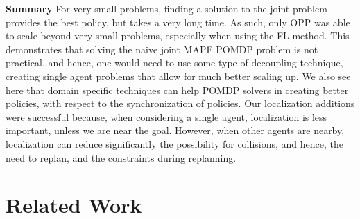 \documentclass[letterpaper]{article}
\begin{document}
\noindent\textbf{Summary} For very small problems, finding a solution to the joint problem provides the best policy, but takes a very long time. As such, only OPP was able to scale beyond very small problems, especially when using the FL method. This demonstrates that solving the naive joint MAPF POMDP problem is not practical, and hence, one would need to use some type of decoupling technique, creating single agent problems that allow for much better scaling up.  We also see here that domain specific techniques can help POMDP solvers in creating better policies, with respect to the synchronization of policies. Our localization additions were successful because, when considering a single agent, localization is less important, unless we are near the goal. However, when other agents are nearby, localization can reduce significantly the possibility for collisions, and hence, the need to replan, and the constraints during replanning.




\vspace{-3.02mm}
\section{Related Work}
\end{document}
